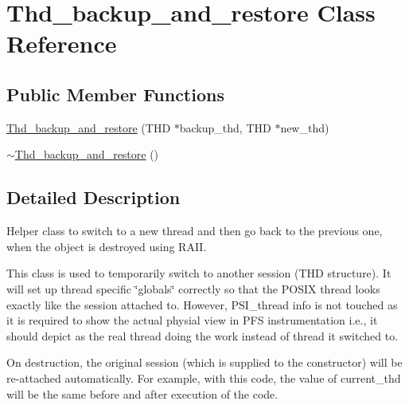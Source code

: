 \hypertarget{classThd__backup__and__restore}{}\section{Thd\+\_\+backup\+\_\+and\+\_\+restore Class Reference}
\label{classThd__backup__and__restore}
\subsection*{Public Member Functions}
\begin{DoxyCompactItemize}
\item 
\mbox{\hyperlink{classThd__backup__and__restore_a398ca9bf7844708a75e02db539710cdc}{Thd\+\_\+backup\+\_\+and\+\_\+restore}} (T\+HD $\ast$backup\+\_\+thd, T\+HD $\ast$new\+\_\+thd)
\item 
\mbox{\hyperlink{classThd__backup__and__restore_ae3573c10978d86ec0510bee8217b5e82}{$\sim$\+Thd\+\_\+backup\+\_\+and\+\_\+restore}} ()
\end{DoxyCompactItemize}


\subsection{Detailed Description}
Helper class to switch to a new thread and then go back to the previous one, when the object is destroyed using R\+A\+II.

This class is used to temporarily switch to another session (T\+HD structure). It will set up thread specific \char`\"{}globals\char`\"{} correctly so that the P\+O\+S\+IX thread looks exactly like the session attached to. However, P\+S\+I\+\_\+thread info is not touched as it is required to show the actual physial view in P\+FS instrumentation i.\+e., it should depict as the real thread doing the work instead of thread it switched to.

On destruction, the original session (which is supplied to the constructor) will be re-\/attached automatically. For example, with this code, the value of {\ttfamily current\+\_\+thd} will be the same before and after execution of the code.


\begin{DoxyCode}{0}
\DoxyCodeLine{\{}
\DoxyCodeLine{  \{}
\DoxyCodeLine{    \textcolor{comment}{// here we are attached to current\_thd}}
\DoxyCodeLine{    \textcolor{comment}{// [...]}}
\DoxyCodeLine{    \textcolor{comment}{// [...]}}
\DoxyCodeLine{    \textcolor{comment}{// here we are attached to other\_thd[i]}}
\DoxyCodeLine{    \textcolor{comment}{// [...]}}
\DoxyCodeLine{  \}}
\DoxyCodeLine{  \textcolor{comment}{// here we are attached to current\_thd}}
\DoxyCodeLine{\}}
\end{DoxyCode}


